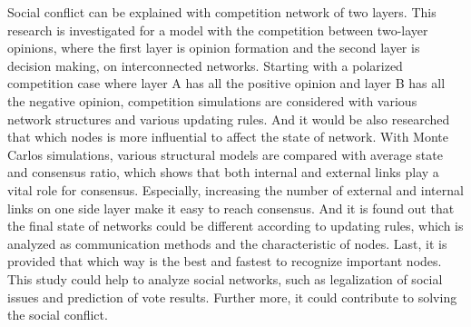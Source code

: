 

\begin{englishabstract}
Social conflict can be explained with competition network of two layers. This research is investigated for a model with the competition between two-layer opinions, where the first layer is opinion formation and the second layer is decision making, on interconnected networks. Starting with a polarized competition case where layer A has all the positive opinion and layer B has all the negative opinion, competition simulations are considered with various network structures and various updating rules. And it would be also researched that which nodes is more influential to affect the state of network. With Monte Carlos simulations, various structural models are compared with average state and consensus ratio, which shows that both internal and external links play a vital role for consensus. Especially, increasing the number of external and internal links on one side layer make it easy to reach consensus. And it is found out that the final state of networks could be different according to updating rules, which is analyzed as communication methods and the characteristic of nodes. Last, it is provided that which way is the best and fastest to recognize important nodes. This study could help to analyze social networks, such as legalization of social issues and prediction of vote results. Further more, it could contribute to solving the social conflict.
\end{englishabstract}

